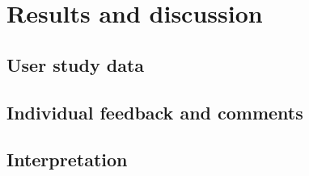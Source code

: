 \chapter{Results and discussion}
\label{sec:results_and_discussion}

\section{User study data}
\label{user_study_data}

\section{Individual feedback and comments}
\label{individual_feedback_and_comments}

\section{Interpretation}
\label{interpretation}
